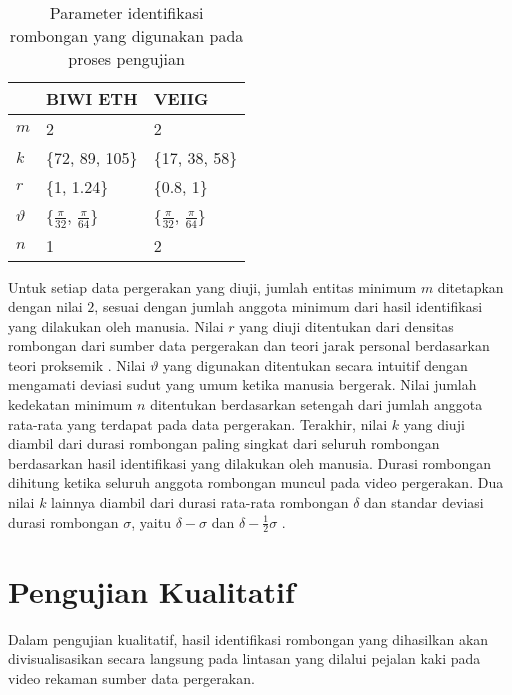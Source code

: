 \begin{table}[h]
    \centering
    \begin{tabular}{p{1cm} p{3cm} p{3cm}}
        \hline
        & \textbf{BIWI ETH} & \textbf{VEIIG} \\
        \hline
        $m$ & 2 & 2 \\
        $k$ & \{72, 89, 105\} & \{17, 38, 58\} \\
        $r$ & \{1, 1.24\} & \{0.8, 1\} \\
        $\vartheta$ & \{$\frac{\pi}{32}$, $\frac{\pi}{64}$\} & \{$\frac{\pi}{32}$, $\frac{\pi}{64}$\} \\
        $n$ & 1 & 2 \\
        \hline
    \end{tabular}
    \caption[Parameter identifikasi rombongan]{Parameter identifikasi rombongan yang digunakan pada proses pengujian}
    \label{bab6:parameter}
\end{table}

Untuk setiap data pergerakan yang diuji, jumlah entitas minimum $m$ ditetapkan dengan nilai $2$, sesuai dengan jumlah anggota minimum dari hasil identifikasi yang dilakukan oleh manusia. Nilai $r$ yang diuji ditentukan dari densitas rombongan dari sumber data pergerakan \cite{solera:06:range-reference} dan teori jarak personal berdasarkan teori proksemik \cite{hall:06:proxemic}. Nilai $\vartheta$ yang digunakan ditentukan secara intuitif dengan mengamati deviasi sudut yang umum ketika manusia bergerak. Nilai jumlah kedekatan minimum $n$ ditentukan berdasarkan setengah dari jumlah anggota rata-rata yang terdapat pada data pergerakan. Terakhir, nilai $k$ yang diuji diambil dari durasi rombongan paling singkat dari seluruh rombongan berdasarkan hasil identifikasi yang dilakukan oleh manusia. Durasi rombongan dihitung ketika seluruh anggota rombongan muncul pada video pergerakan. Dua nilai $k$ lainnya diambil dari durasi rata-rata rombongan $\delta$ dan standar deviasi durasi rombongan $\sigma$, yaitu $\delta - \sigma$ dan $\delta - \frac{1}{2}\sigma$ \cite{wiratma:trajectory}.

\section{Pengujian Kualitatif}
\label{sec:qualitative}

Dalam pengujian kualitatif, hasil identifikasi rombongan yang dihasilkan akan divisualisasikan secara langsung pada lintasan yang dilalui pejalan kaki pada video rekaman sumber data pergerakan.


